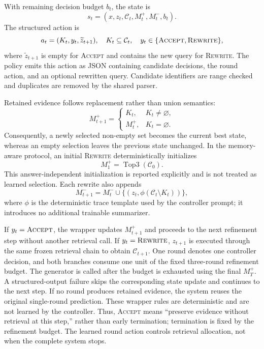 With remaining decision budget $b_t$, the state is
\begin{equation}
 s_t=(x,z_t,\mathcal{C}_t,M_t^+,M_t^-,b_t).
 \label{eq:state}
\end{equation}
The structured action is
\begin{equation}
 a_t=(K_t,y_t,\widetilde z_{t+1}),\quad
 K_t\subseteq\mathcal{C}_t,\quad
 y_t\in\{\textsc{Accept},\textsc{Rewrite}\},
 \label{eq:action}
\end{equation}
where $\widetilde z_{t+1}$ is empty for \textsc{Accept} and contains the new
query for \textsc{Rewrite}.
The policy emits this action as JSON containing candidate decisions, the round
action, and an optional rewritten query. Candidate identifiers are range
checked and duplicates are removed by the shared parser.

Retained evidence follows replacement rather than union semantics:
\begin{equation}
 M_{t+1}^+=
 \begin{cases}
 K_t, & K_t\neq\varnothing,\\
 M_t^+, & K_t=\varnothing.
 \end{cases}
\label{eq:mplus}
\end{equation}
Consequently, a newly selected non-empty set becomes the current best state,
whereas an empty selection leaves the previous state unchanged. In the
memory-aware protocol, an initial \textsc{Rewrite} deterministically initializes
\begin{equation}
 M_1^+=\operatorname{Top3}(\mathcal{C}_0).
 \label{eq:mplus-init}
\end{equation}
This answer-independent initialization is reported explicitly and is not
treated as learned selection. Each rewrite also appends
\begin{equation}
 M_{t+1}^-=M_t^-\cup
 \{(z_t,\phi(\mathcal{C}_t\setminus K_t))\},
 \label{eq:mminus}
\end{equation}
where $\phi$ is the deterministic trace template used by the controller
prompt; it introduces no additional trainable summarizer.

If $y_t=\textsc{Accept}$, the wrapper updates $M_{t+1}^+$ and proceeds to the
next refinement step without another retrieval call. If
$y_t=\textsc{Rewrite}$, $z_{t+1}$ is executed through the same frozen retrieval
chain to obtain $\mathcal{C}_{t+1}$. One round denotes one controller decision,
and both branches consume one unit of the fixed three-round refinement budget.
The generator is called after the budget is exhausted using the final
$M_T^+$. A structured-output failure skips the corresponding state update and
continues to the next step. If no round produces retained evidence, the system
reuses the original single-round prediction. These wrapper rules are
deterministic and are not learned by the controller.
Thus, \textsc{Accept} means ``preserve evidence without retrieval at this
step,'' rather than early termination; termination is fixed by the refinement
budget. The learned round action controls retrieval allocation, not when the
complete system stops.

